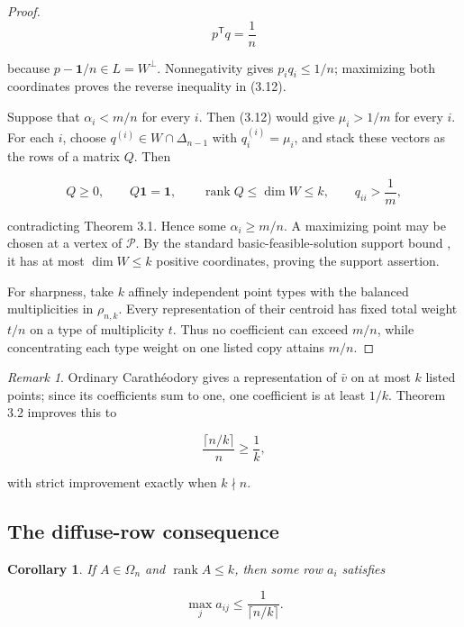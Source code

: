 \documentclass[11pt]{article}
\newtheorem{corollary}[theorem]{Corollary}
\theoremstyle{remark}
\newtheorem*{remark}{Remark}
\begin{document}
\begin{proof}
\[
 p^{\mathsf T}q=\frac1n                                   \tag{3.15}
\]

because \(p-\mathbf1/n\in L=W^\perp\). Nonnegativity gives
\(p_iq_i\leq1/n\); maximizing both coordinates proves the reverse
inequality in (3.12).

Suppose that \(\alpha_i<m/n\) for every \(i\). Then (3.12) would give
\(\mu_i>1/m\) for every \(i\). For each \(i\), choose
\(q^{(i)}\in W\cap\Delta_{n-1}\) with \(q_i^{(i)}=\mu_i\), and stack these
vectors as the rows of a matrix \(Q\). Then

\[
 Q\geq0,
 \qquad Q\mathbf1=\mathbf1,
 \qquad \operatorname{rank}Q\leq\dim W\leq k,
 \qquad q_{ii}>\frac1m,                                   \tag{3.16}
\]

contradicting Theorem 3.1. Hence some \(\alpha_i\geq m/n\). A maximizing
point may be chosen at a vertex of \(\mathcal P\). By the standard
basic-feasible-solution support bound \cite{schrijver1986}, it has at most
\(\dim W\leq k\) positive coordinates, proving the support assertion.

For sharpness, take \(k\) affinely independent point types with the balanced
multiplicities in \(\rho_{n,k}\). Every representation of their centroid has
fixed total weight \(t/n\) on a type of multiplicity \(t\). Thus no
coefficient can exceed \(m/n\), while concentrating each type weight on one
listed copy attains \(m/n\).
\end{proof}

\begin{remark}
Ordinary Carath\'eodory gives a
representation of \(\bar v\) on at most \(k\) listed points; since its
coefficients sum to one, one coefficient is at least \(1/k\). Theorem 3.2
improves this to

\[
 \frac{\lceil n/k\rceil}{n}\geq\frac1k,
\]

with strict improvement exactly when \(k\nmid n\).
\end{remark}

\subsection{The diffuse-row consequence}

\begin{corollary}
If \(A\in\Omega_n\) and
\(\operatorname{rank}A\leq k\), then some row \(a_i\) satisfies

\[
 \boxed{\max_j a_{ij}\leq
 \frac1{\lceil n/k\rceil}.}                                \tag{3.17}
\]
\end{corollary}
\end{document}
